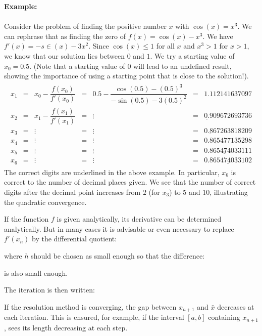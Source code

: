 	\begin{tcolorbox}[colframe=black,colback=white,sharp corners]
	\textbf{{\Large {}}Example:}\\\\
	Consider the problem of finding the positive number $x$ with $\cos(x) = x^3$. We can rephrase that as finding the zero of $f(x) = \cos(x) - x^3$. We have $f'(x) = -s\in(x) - 3x^2$. Since $\cos(x) \leq 1$ for all $x$ and $x^3 > 1$ for $x > 1$, we know that our solution lies between $0$ and $1$. We try a starting value of $x_0 = 0.5$. (Note that a starting value of $0$ will lead to an undefined result, showing the importance of using a starting point that is close to the solution!).
	\begin{gather*}
		\begin{matrix}
  x_1 & = & x_0 - \dfrac{f(x_0)}{f'(x_0)} & = & 0.5 - \dfrac{\cos(0.5) - (0.5)^3}{-\sin(0.5) - 3(0.5)^2} & = & 1.112141637097 \\
  x_2 & = & x_1 - \dfrac{f(x_1)}{f'(x_1)} & = & \vdots & = & \underline{0.}909672693736 \\
  x_3 & = & \vdots & = & \vdots & = & \underline{0.86}7263818209 \\
  x_4 & = & \vdots & = & \vdots & = & \underline{0.86547}7135298 \\
  x_5 & = & \vdots & = & \vdots & = & \underline{0.8654740331}11 \\
  x_6 & = & \vdots &= & \vdots & = & \underline{0.865474033102}
	\end{matrix}	
	\end{gather*}
	The correct digits are underlined in the above example. In particular, $x_6$ is correct to the number of decimal places given. We see that the number of correct digits after the decimal point increases from $2$ (for $x_3$) to $5$ and $10$, illustrating the quadratic convergence.
	\end{tcolorbox}
	If the function $f$ is given analytically, its derivative can be determined analytically. But in many cases it is advisable or even necessary to replace $f'(x_n)$ by the differential quotient:
	
	where $h$ should be chosen as small enough so that the difference:
	
	is also small enough.

	The iteration is then written:
	
	If the resolution method is converging, the gap between $x_{n+1}$ and $\bar{x}$ decreases at each iteration. This is ensured, for example, if the interval $[a, b]$ containing $x_{n+1}$, sees its length decreasing at each step. 

